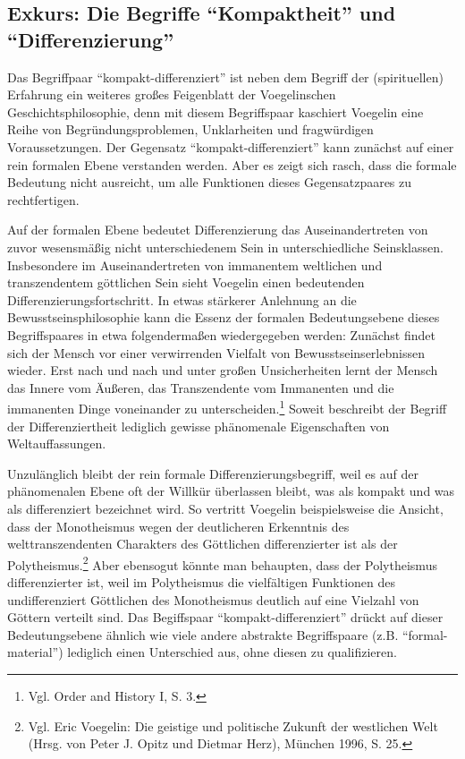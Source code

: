 \subsection{Exkurs: Die Begriffe "`Kompaktheit"' und "`Differenzierung"'}
\label{KompaktDifferenziert}
Das Begriffpaar "`kompakt-differenziert"' ist neben dem Begriff der
(spirituellen) Erfahrung ein weiteres großes Feigenblatt der Voegelinschen
Geschichtsphilosophie, denn mit diesem Begriffspaar kaschiert Voegelin eine
Reihe von Begründungsproblemen, Unklarheiten und fragwürdigen Voraussetzungen.
Der Gegensatz "`kompakt-differenziert"' kann zunächst auf einer rein formalen
Ebene verstanden werden. Aber es zeigt sich rasch, dass die formale Bedeutung
nicht ausreicht, um alle Funktionen dieses Gegensatzpaares zu rechtfertigen.

Auf der formalen Ebene bedeutet Differenzierung das Auseinandertreten von
zuvor wesensmäßig nicht unterschiedenem Sein in unterschiedliche Seinsklassen.
Insbesondere im Auseinandertreten von immanentem weltlichen und transzendentem
göttlichen Sein sieht Voegelin einen bedeutenden Differenzierungsfortschritt.
In etwas stärkerer Anlehnung an die Bewusstseinsphilosophie kann die
Essenz der formalen Bedeutungsebene dieses Begriffspaares in etwa
folgendermaßen wiedergegeben werden: Zunächst findet sich der Mensch vor einer
verwirrenden Vielfalt von Bewusstseinserlebnissen wieder. Erst nach und nach
und unter großen Unsicherheiten lernt der Mensch das Innere vom Äußeren, das
Transzendente vom Immanenten und die immanenten Dinge voneinander zu
unterscheiden.\footnote{Vgl. Order and History I, S. 3.} Soweit beschreibt der
Begriff der Differenziertheit lediglich gewisse phänomenale Eigenschaften von
Weltauf\/fassungen.

Unzulänglich bleibt der rein formale Differenzierungsbegriff, weil es auf der
phänomenalen Ebene oft der Willkür überlassen bleibt, was als kompakt und was
als differenziert bezeichnet wird. So vertritt Voegelin beispielsweise die
Ansicht, dass der Monotheismus wegen der deutlicheren Erkenntnis des
welttranszendenten Charakters des Göttlichen differenzierter ist als der
Polytheismus.\footnote{Vgl. Eric Voegelin: Die geistige und politische Zukunft
  der westlichen Welt (Hrsg. von Peter J. Opitz und Dietmar Herz), München
  1996, S. 25.} Aber ebensogut könnte man behaupten, dass der Polytheismus
differenzierter ist, weil im Polytheismus die vielfältigen Funktionen des
undifferenziert Göttlichen des Monotheismus deutlich auf eine Vielzahl von
Göttern verteilt sind. Das Begiffspaar "`kompakt-differenziert"' drückt auf
dieser Bedeutungsebene ähnlich wie viele andere abstrakte Begriffspaare (z.B.
"`formal-material"') lediglich einen Unterschied aus, ohne diesen zu
qualifizieren.

